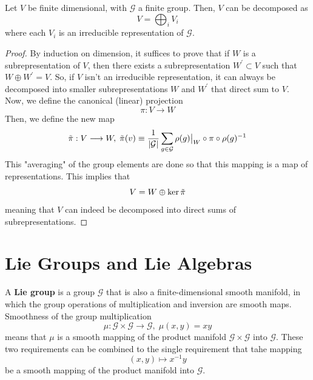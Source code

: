 \documentclass{article}
\begin{document}
  \begin{theorem}
    Let $V$ be finite dimensional, with $\mathcal{G}$ a finite group. Then, $V$ can be decomposed as 
    \begin{equation}
      V = \bigoplus_{i} V_i
    \end{equation}
    where each $V_i$ is an irreducible representation of $\mathcal{G}$. 
  \end{theorem}
  \begin{proof}
    By induction on dimension, it suffices to prove that if $W$ is a subrepresentation of $V$, then there exists a subrepresentation $W^\prime \subset V$ such that $W \oplus W^\prime = V$. So, if $V$ isn't an irreducible representation, it can always be decomposed into smaller subrepresentations $W$ and $W^\prime$ that direct sum to $V$. Now, we define the canonical (linear) projection 
    \begin{equation}
      \pi: V \longrightarrow W
    \end{equation}
    Then, we define the new map 
    \begin{equation}
      \Tilde{\pi}: V \longrightarrow W, \; \Tilde{\pi}(v) \equiv \frac{1}{|\mathcal{G}|} \sum_{g \in \mathcal{G}} \rho(g)\big|_W \circ \pi \circ \rho(g)^{-1}
    \end{equation}
    This "averaging" of the group elements are done so that this mapping is a map of representations. This implies that 
    \begin{equation}
      V = W \oplus \ker{\Tilde{\pi}}
    \end{equation}
    meaning that $V$ can indeed be decomposed into direct sums of subrepresentations. 
  \end{proof}

\section{Lie Groups and Lie Algebras}

    \begin{definition}
      A \textbf{Lie group} is a group $\mathcal{G}$ that is also a finite-dimensional smooth manifold, in which the group operations of multiplication and inversion are smooth maps. Smoothness of the group multiplication
      \begin{equation}
        \mu: \mathcal{G} \times \mathcal{G} \longrightarrow \mathcal{G}, \; \mu(x, y) = x y
      \end{equation}
      means that $\mu$ is a smooth mapping of the product manifold $\mathcal{G} \times \mathcal{G}$ into $\mathcal{G}$. These two requirements can be combined to the single requirement that tahe mapping 
      \begin{equation}
        (x, y) \mapsto x^{-1} y
      \end{equation}
      be a smooth mapping of the product manifold into $\mathcal{G}$. 
    \end{definition}
\end{document}
